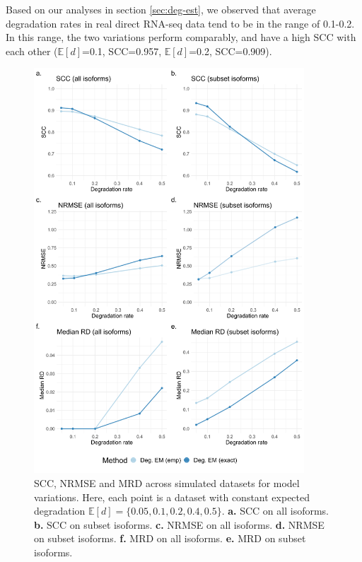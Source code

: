 Based on our analyses in section \ref{sec:deg-est}, we observed that average degradation rates in real direct RNA-seq data tend to be in the range of 0.1-0.2. In this range, the two variations perform comparably, and have a high SCC with each other ($\mathbb{E}[d]$=0.1, SCC=0.957, $\mathbb{E}[d]$=0.2, SCC=0.909).  

\begin{figure}[H]
    \centering
    \includegraphics[width=0.9\textwidth]{figures/sec-4-1-scc-nrmse.png}
    \caption[SCC, NRMSE and MRD across simulated datasets for model variations]{SCC, NRMSE and MRD across simulated datasets for model variations. Here, each point is a dataset with constant expected degradation $\mathbb{E}[d]=\{0.05,0.1,0.2,0.4,0.5\}$. \textbf{a.} SCC on all isoforms. \textbf{b.} SCC on subset isoforms. \textbf{c.} NRMSE on all isoforms. \textbf{d.} NRMSE on subset isoforms. \textbf{f.} MRD on all isoforms. \textbf{e.} MRD on subset isoforms.}
    \label{fig:4-1-scc-nrmse}
\end{figure}

